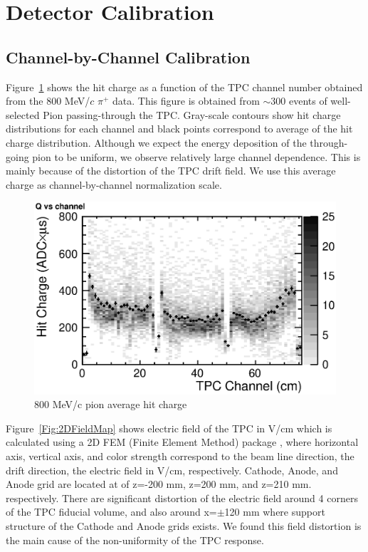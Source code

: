 \section{Detector Calibration}

\subsection{Channel-by-Channel Calibration}

Figure~\ref{fig:PionQvsCh} shows the hit charge as a function of 
the TPC channel number obtained from the 800 MeV/$c$ $\pi^+$ data. 
This figure is obtained from $\sim$300 events of well-selected Pion passing-through the TPC.
Gray-scale contours show hit charge distributions for
each channel and black points correspond to average of the hit charge distribution.  
Although we expect the energy deposition of the through-going pion to be uniform,
we observe relatively large channel dependence. 
This is mainly because of the distortion of the TPC drift field.
We use this average charge as channel-by-channel normalization scale.

\begin{figure}[htbp]
 \begin{center}
  \includegraphics[width=1.0\hsize]{fig/PionQvsCh.eps}
 \end{center}
 \caption{800 MeV/c pion average hit charge}
 \label{fig:PionQvsCh}
\end{figure}

Figure~\ref{Fig:2DFieldMap} shows electric field of the TPC in V/cm which 
is calculated using a 2D FEM (Finite Element Method) package \cite{Ref:FEMTET},
where horizontal axis, vertical axis, and color strength 
correspond to the beam line direction, the drift direction, the electric field in V/cm, respectively.
Cathode, Anode, and Anode grid are located at of z=-200 mm, z=200 mm, and z=210 mm. respectively.
There are significant distortion of the electric field around 4 corners of the TPC fiducial volume,
and also around x=$\pm$120 mm where support structure of the Cathode and Anode grids exists.
We found this field distortion is the main cause of the
non-uniformity of the TPC response.

